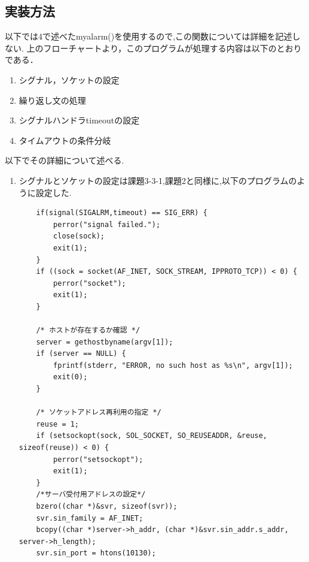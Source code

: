 \documentclass[dvipdfmx]{jarticle}
\begin{document}
\subsection{実装方法}
以下では4で述べたmyalarm()を使用するので,この関数については詳細を記述しない.
上のフローチャートより，このプログラムが処理する内容は以下のとおりである．
\begin{enumerate}
    \item シグナル，ソケットの設定
    \item 繰り返し文の処理
    \item シグナルハンドラtimeoutの設定
    \item タイムアウトの条件分岐
\end{enumerate}
以下でその詳細について述べる.
\begin{enumerate}
    \item シグナルとソケットの設定は課題3-3-1,課題2と同様に,以下のプログラムのように設定した.
    \begin{lstlisting}
    if(signal(SIGALRM,timeout) == SIG_ERR) {
        perror("signal failed.");
        close(sock);
        exit(1);
    } 
    if ((sock = socket(AF_INET, SOCK_STREAM, IPPROTO_TCP)) < 0) {
        perror("socket");
        exit(1);
    }

    /* ホストが存在するか確認 */
    server = gethostbyname(argv[1]);
    if (server == NULL) {
        fprintf(stderr, "ERROR, no such host as %s\n", argv[1]);
        exit(0);
    }

    /* ソケットアドレス再利用の指定 */
    reuse = 1;
    if (setsockopt(sock, SOL_SOCKET, SO_REUSEADDR, &reuse, sizeof(reuse)) < 0) {
        perror("setsockopt");
        exit(1);
    }
    /*サーバ受付用アドレスの設定*/
    bzero((char *)&svr, sizeof(svr));
    svr.sin_family = AF_INET;
    bcopy((char *)server->h_addr, (char *)&svr.sin_addr.s_addr, server->h_length);
    svr.sin_port = htons(10130);


\end{lstlisting}
\end{enumerate}
\end{document}
